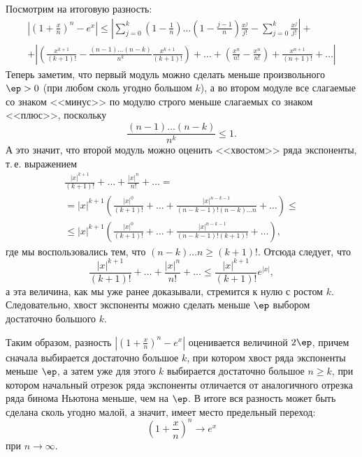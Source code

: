 \begin{enumerate}
Посмотрим на итоговую разность:
\begin{multline*}
\left|\left(1+\frac xn\right)^n-e^x\right| \le 
\left|\sum_{j=0}^k\left(1-\frac 1n\right)\dots\left(1-\frac{j-1}{n}\right)\frac{x^j}{j!}-\sum_{j=0}^k\frac{x^j}{j!}\right|+ \\
+ \left|\left(\frac{x^{k+1}}{(k+1)!}-\frac{(n-1)\dots(n-k)}{n^{k}}\frac{x^{k+1}}{(k+1)!}\right)
+ \dots + \left(\frac{x^n}{n!} - \frac{x^n}{n!}\right) + \frac{x^{n+1}}{(n+1)!}+\dots\right|
\end{multline*}
Теперь заметим, что первый модуль можно сделать меньше произвольного $\ep>0$ (при любом сколь угодно большом $k$), а во втором модуле все слагаемые со знаком <<минус>> по модулю строго меньше слагаемых со знаком <<плюс>>, поскольку
$$
\frac{(n-1)\dots(n-k)}{n^{k}}\le 1.
$$
А это значит, что второй модуль можно оценить <<хвостом>> ряда экспоненты, т.\,е. выражением
\begin{multline*}
\frac{|x|^{k+1}}{(k+1)!} + \dots + \frac{|x|^n}{n!} + \dots = \\
= |x|^{k+1}\left(\frac{|x|^0}{(k+1)!} + \dots + \frac{|x|^{n-k-1}}{(n-k-1)!(n-k)\dots n}+\dots\right)\le \\
\le |x|^{k+1}\left(\frac{|x|^0}{(k+1)!} + \dots + \frac{|x|^{n-k-1}}{(n-k-1)!(k+1)!}+\dots\right),
\end{multline*}
где мы воспользовались тем, что $(n-k)\dots n\ge (k+1)!$.
Отсюда следует, что
\begin{equation}\label{exp-chvost}
\frac{|x|^{k+1}}{(k+1)!} + \dots + \frac{|x|^n}{n!} + \dots \le \frac{|x|^{k+1}}{(k+1)!}e^{|x|},
\end{equation}
а эта величина, как мы уже ранее доказывали, стремится к нулю с ростом $k$. Следовательно, хвост экспоненты можно сделать меньше $\ep$ выбором достаточно большого $k$.

Таким образом, разность $\left|\left(1+\frac xn\right)^n-e^x\right|$ оценивается величиной $2\ep$, причем сначала выбирается достаточно большое $k$, при котором хвост ряда экспоненты меньше $\ep$, а затем уже для этого $k$ выбирается достаточно большое $n\ge k$, при котором начальный отрезок ряда экспоненты отличается от аналогичного отрезка ряда бинома Ньютона меньше, чем на $\ep$. В итоге вся разность может быть сделана сколь угодно малой, а значит, имеет место предельный переход:
$$
\left(1+\frac xn\right)^n\to e^x
$$
при $n\to\infty$.
\epf
\end{enumerate}





